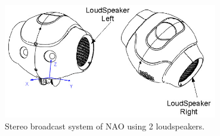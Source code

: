 \begin{figure}
	[h] \centering 
	\includegraphics[height=5cm]{figures/content/nao-audio.jpg} \caption{Stereo broadcast system of NAO using 2 loudspeakers. \cite{8}} \label{fg:nao:audio} 
\end{figure}
